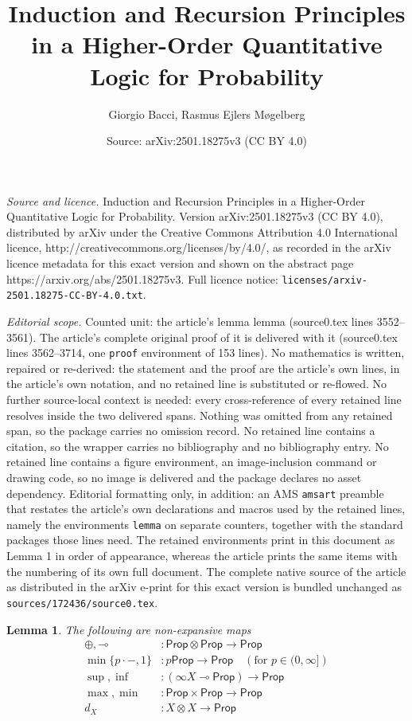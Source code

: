 \documentclass[10pt,a4paper]{amsart}
\title{Induction and Recursion Principles in a Higher-Order Quantitative Logic for Probability}
\author{Giorgio Bacci, Rasmus Ejlers M{\o}gelberg}
\date{Source: arXiv:2501.18275v3 (CC BY 4.0)}
\newtheorem{lemma}{Lemma}
\newcommand{\Prop}{\mathsf{Prop}}
\newcommand{\lol}{\mathbin{\multimap}}
\newcommand{\mexp}{\lol}
\newcommand{\mprod}{\otimes}
\newcommand{\scaling}{}
\begin{document}
\maketitle

\noindent\emph{Source and licence.} Induction and Recursion Principles in a Higher-Order Quantitative Logic for Probability. Version arXiv:2501.18275v3 (CC BY 4.0), distributed by arXiv under the Creative Commons Attribution 4.0 International licence, http://creativecommons.org/licenses/by/4.0/, as recorded in the arXiv licence metadata for this exact version and shown on the abstract page https://arxiv.org/abs/2501.18275v3. Full licence notice: \texttt{licenses/arxiv-2501.18275-CC-BY-4.0.txt}.\par\smallskip

\noindent\textit{Editorial scope.} Counted unit: the article's lemma lemma (source0.tex lines 3552--3561). The article's complete original proof of it is delivered with it (source0.tex lines 3562--3714, one \texttt{proof} environment of 153 lines). No mathematics is written, repaired or re-derived: the statement and the proof are the article's own lines, in the article's own notation, and no retained line is substituted or re-flowed.  No further source-local context is needed: every cross-reference of every retained line resolves inside the two delivered spans.  Nothing was omitted from any retained span, so the package carries no omission record.  No retained line contains a citation, so the wrapper carries no bibliography and no bibliography entry.  No retained line contains a figure environment, an image-inclusion command or drawing code, so no image is delivered and the package declares no asset dependency.  Editorial formatting only, in addition: an AMS \texttt{amsart} preamble that restates the article's own declarations and macros used by the retained lines, namely the environments \texttt{lemma} on separate counters, together with the standard packages those lines need.  The retained environments print in this document as Lemma 1 in order of appearance, whereas the article prints the same items with the numbering of its own full document.  The complete native source of the article as distributed in the arXiv e-print for this exact version is bundled unchanged as \texttt{sources/172436/source0.tex}.
\begin{lemma}
The following are non-expansive maps
\begin{align*}
 {\oplus}, {\lol} &\colon  \Prop \mprod \Prop \to \Prop \\
 \min\{p\cdot -, 1\} &\colon p \scaling \Prop \to \Prop   \quad (\text{for $p \in (0,\infty]$})\\
 {\sup}, {\inf} &\colon (\infty \scaling X \mexp \Prop) \to \Prop \\
 \max, \min &\colon \Prop \times \Prop \to \Prop \\
 d_X &\colon X \mprod X \to \Prop
\end{align*}
\end{lemma}
\end{document}
